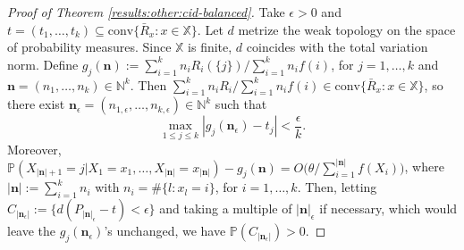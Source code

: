 \documentclass[a4paper]{article}
\theoremstyle{plain}
\theoremstyle{remark}
\theoremstyle{definition}
\begin{document}
\begin{proof}[Proof of Theorem \ref{results:other:cid-balanced}]
Take $\epsilon>0$ and $t=(t_1,\ldots,t_k)\subseteq\mbox{conv}\{\bar{R}_x:x\in\mathbb{X}\}$. Let $d$ metrize the weak topology on the space of probability measures. Since $\mathbb{X}$ is finite, $d$ coincides with the total variation norm. Define $g_j(\textbf{n}):=\sum_{i=1}^{k}n_iR_{i}(\{j\})/\sum_{i=1}^kn_if(i)$, for $j=1,\ldots,k$ and $\textbf{n}=(n_1,\ldots,n_k)\in\mathbb{N}^k$. Then $\sum_{i=1}^{k}n_iR_{i}/\sum_{i=1}^kn_if(i)\in\mbox{conv}\{\bar{R}_x:x\in\mathbb{X}\}$, so there exist $\textbf{n}_\epsilon=(n_{1,\epsilon},\ldots,n_{k,\epsilon})\in\mathbb{N}^k$ such that
\[\max_{1\leq j\leq k}|g_j(\textbf{n}_\epsilon)-t_j|<\frac{\epsilon}{k}.\]
Moreover, $\mathbb{P}(X_{|\textbf{n}|+1}=j|X_1=x_1,\ldots,X_{|\textbf{n}|}=x_{|\textbf{n}|})-g_j(\textbf{n})=O\bigl(\theta/\sum_{i=1}^{|\textbf{n}|}f(X_i)\bigr)$, where $|\textbf{n}|:=\sum_{i=1}^kn_i$ with $n_i=\#\{l:x_l=i\}$, for $i=1,\ldots,k$. Then, letting $C_{|\textbf{n}_\epsilon|}:=\{d(P_{|\textbf{n}|_\epsilon}-t)<\epsilon\}$ and taking a multiple of $|\textbf{n}|_\epsilon$ if necessary, which would leave the $g_j(\textbf{n}_\epsilon)$'s unchanged, we have $\mathbb{P}(C_{|\textbf{n}_\epsilon|})>0$.


\end{proof}
\end{document}
